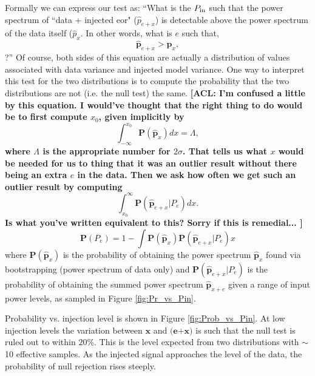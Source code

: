 \documentclass[preprint2,numberedappendix,tighten]{aastex6}  %
\newcommand{\acl}[1]{{\color{red} \textbf{[ACL:  #1]}}}
\newcommand{\Prob}{\mathbf{P}}
\begin{document}
Formally we can express our test as: ``What is the $P_{\rm in}$ such that the power spectrum of ``data + 
injected eor" ($\widehat{p}_{e+x}$) is detectable above the power spectrum of the data itself ($\widehat{p}_x$. 
In other words, what is $e$ such that,
\begin{equation}
\widehat{\textbf{p}}_{e+x} > \widehat{\textbf{p}}_{x},
\end{equation}  
?''  Of course, both sides of this equation are actually a distribution of values associated with data variance and injected model variance. One way to interpret this test for the two distributions is to compute the probability that the two distributions are not (i.e. the null test) the same.  
 \acl{I'm confused a little by this equation. I would've thought that the right thing to do would be to first compute $x_0$, given implicitly by
 \begin{equation}
 \int_{-\infty}^{x_0}\Prob(\widehat{\textbf{p}}_x) dx = \Lambda,
 \end{equation}
 where $\Lambda$ is the appropriate number for $2\sigma$. That tells us what $x$ would be needed for us to thing that it was an outlier result without there being an extra $e$ in the data. Then we ask how often we get such an outlier result by computing
  \begin{equation}
 \int_{x_0}^\infty \Prob(\widehat{\textbf{p}}_{e+x}|P_{e}) dx.
\end{equation}
Is what you've written equivalent to this? Sorry if this is remedial...
 }
 \begin{equation}
\Prob(P_{e})  =  1 -  \int \Prob(\widehat{\textbf{p}}_x) \Prob(\widehat{\textbf{p}}_{e+x}|P_{e}) x
 \end{equation}
 where $\Prob(\widehat{\textbf{p}}_x)$ is the probability of obtaining the power spectrum $\widehat{\textbf{p}}_x$ found via bootstrapping (power spectrum of data only) and $\Prob(\widehat{\textbf{p}}_{e+x}|P_{e})$ is the probability of obtaining the summed power spectrum $\widehat{\textbf{p}}_{x+e}$ given a range of input power levels, as sampled in Figure \ref{fig:Pr_vs_Pin}.  
 
Probability vs. injection level is shown in Figure \ref{fig:Prob_vs_Pin}. At low injection levels the variation between $\textbf{x}$ and $\textbf{(e+x)}$ is such that the null test is ruled out to within $20$\%. This is the level expected from two distributions with $\sim$10 effective samples. 
As the injected signal approaches the level of the data, the probability of null rejection rises steeply.
  
\end{document}
